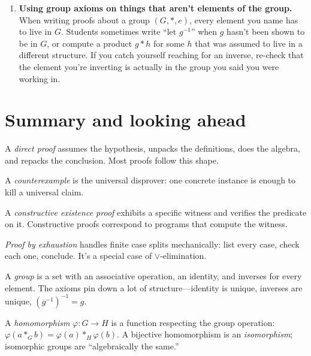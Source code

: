 \documentclass[11pt]{article}
\begin{document}
\begin{enumerate}
  \item \textbf{Using group axioms on things that aren't elements of the group.} When writing proofs about a group $(G, *, e)$, every element you name has to live in $G$. Students sometimes write ``let $g^{-1}$'' when $g$ hasn't been shown to be in $G$, or compute a product $g * h$ for some $h$ that was assumed to live in a different structure. If you catch yourself reaching for an inverse, re-check that the element you're inverting is actually in the group you said you were working in.
\end{enumerate}

\section{Summary and looking ahead}

\begin{keytakeaway}
  \item A \emph{direct proof} assumes the hypothesis, unpacks the definitions, does the algebra, and repacks the conclusion. Most proofs follow this shape.
  \item A \emph{counterexample} is the universal disprover: one concrete instance is enough to kill a universal claim.
  \item A \emph{constructive existence proof} exhibits a specific witness and verifies the predicate on it. Constructive proofs correspond to programs that compute the witness.
  \item \emph{Proof by exhaustion} handles finite case splits mechanically: list every case, check each one, conclude. It's a special case of $\vee$-elimination.
  \item A \emph{group} is a set with an associative operation, an identity, and inverses for every element. The axioms pin down a lot of structure---identity is unique, inverses are unique, $(g^{-1})^{-1} = g$.
  \item A \emph{homomorphism} $\varphi : G \to H$ is a function respecting the group operation: $\varphi(a *_G b) = \varphi(a) *_H \varphi(b)$. A bijective homomorphism is an \emph{isomorphism}; isomorphic groups are ``algebraically the same.''
\end{keytakeaway}
\end{document}
